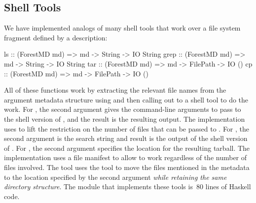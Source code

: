\subsection{Shell Tools}
We have implemented analogs of many shell tools that work
over a file system fragment defined by a
\forest{} description:
\begin{code}
ls    :: (ForestMD md) => md -> String -> IO String
grep  :: (ForestMD md) => md -> String -> IO String
tar   :: (ForestMD md) => md -> FilePath -> IO ()
cp    :: (ForestMD md) => md -> FilePath -> IO ()
\end{code}
All of these functions work by extracting the relevant file names from
the argument metadata structure using  and then calling
out to a shell tool to do the work.  For , the second argument
gives the command-line arguments to pass to the shell version of
, and the result is the resulting output. The implementation
uses  to lift the restriction on the number of files that can
be passed to . For , the second argument is the 
search string and result is the output of the shell version of . For
, the second argument specifies the location for the resulting
tarball.  The implementation uses a file manifest to allow  to
work regardless of the number of files involved.  The  tool
uses the  tool to move the files mentioned in the metadata to
the location specified by the second argument \textit{while retaining
the same directory structure}.   
The module that implements these tools is~80 lines of Haskell code.

